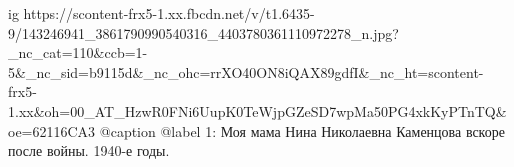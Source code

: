  
 
 
 
 

\ifcmt
  ig https://scontent-frx5-1.xx.fbcdn.net/v/t1.6435-9/143246941_3861790990540316_4403780361110972278_n.jpg?_nc_cat=110&ccb=1-5&_nc_sid=b9115d&_nc_ohc=rrXO40ON8iQAX89gdfI&_nc_ht=scontent-frx5-1.xx&oh=00_AT_HzwR0FNi6UupK0TeWjpGZeSD7wpMa50PG4xkKyPTnTQ&oe=62116CA3
  @caption @label 1: Моя мама Нина Николаевна Каменцова вскоре после войны. 1940-е годы.
\fi
